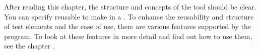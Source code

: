 After reading this chapter, the structure and concepts of the tool should be 
clear. You can specify reusable \gdcases{} to make \gdsuites{} in a \gdproject{}. To  enhance the 
reusability and structure of test elements and the ease of use,
 there are various features supported by the 
program. To look at these features in more detail and find out how to use
them, see the  chapter .






     
